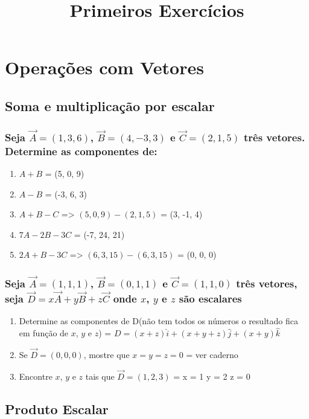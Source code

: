 \documentclass[a4paper,10pt]{article}
\title{Primeiros Exercícios}
\author{}
\begin{document}
\maketitle

\section{Operações com Vetores}

\subsection{Soma e multiplicação por escalar}

\subsubsection{Seja $\vec{A}=(1,3,6)$, $\vec{B}=(4,-3,3)$ e $\vec{C}=(2,1,5)$ três vetores. Determine as componentes de:}

\begin{enumerate}
 \item $A + B$ = 
 (5, 0, 9) 
 
 \item $A - B$ = 
 (-3, 6, 3)
 
 \item $A + B - C$ =>
  $(5, 0, 9) - (2, 1, 5)$ = (3, -1, 4)
 
 \item $7A - 2B - 3C$ = 
 (-7, 24, 21)
 
 \item $2A + B - 3C$ => 
 $(6, 3, 15) - (6, 3, 15)$ = (0, 0, 0)

\end{enumerate}

\subsubsection{Seja $\vec{A}=(1,1,1)$, $\vec{B}=(0,1,1)$ e $\vec{C}=(1,1,0)$ três vetores, seja 
$\vec{D}=x\vec{A} + y\vec{B} + z\vec{C}$ onde $x$, $y$ e $z$ são escalares}


\begin{enumerate}
 \item Determine as componentes de D(não tem todos os números o resultado fica em função de $x$, $y$ e $z$) =  
 $D = (x + z)\hat{i} + (x + y + z)\hat{j} + (x + y)\hat{k}$
 
 
  
 \item Se $\vec{D}=(0,0,0)$, mostre que $x=y=z=0$ =  
 ver caderno
 
 \item Encontre $x$, $y$ e $z$ tais que $\vec{D}=(1,2,3)$ = 
 x = 1
 y = 2
 z = 0
 
\end{enumerate}

\subsection{Produto Escalar}
\end{document}
